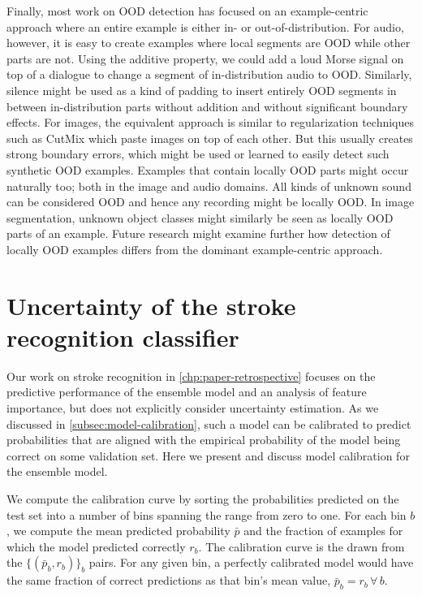 Finally, most work on OOD detection has focused on an example-centric approach where an entire example is either in- or out-of-distribution. 
For audio, however, it is easy to create examples where local segments are OOD while other parts are not. 
Using the additive property, we could add a loud Morse signal on top of a dialogue to change a segment of in-distribution audio to OOD. 
Similarly, silence might be used as a kind of padding to insert entirely OOD segments in between in-distribution parts without addition and without significant boundary effects. 
For images, the equivalent approach is similar to regularization techniques such as CutMix \parencite{yun_cutmix_2019} which paste images on top of each other. But this usually creates strong boundary errors, which might be used or learned to easily detect such synthetic OOD examples. 
Examples that contain locally OOD parts might occur naturally too; both in the image and audio domains. All kinds of unknown sound can be considered OOD and hence any recording might be locally OOD. In image segmentation, unknown object classes might similarly be seen as locally OOD parts of an example. Future research might examine further how detection of locally OOD examples differs from the dominant example-centric approach. 


\section{Uncertainty of the stroke recognition classifier} \label{sec: discussion-stroke-recognition-uncertainty}

Our work on stroke recognition in \cref{chp:paper-retrospective} focuses on the predictive performance of the ensemble model and an analysis of feature importance, but does not explicitly consider uncertainty estimation. 
As we discussed in \cref{subsec:model-calibration}, such a model can be calibrated to predict probabilities that are aligned with the empirical probability of the model being correct on some validation set. Here we present and discuss model calibration for the ensemble model. 

We compute the calibration curve by sorting the probabilities predicted on the test set into a number of bins spanning the range from zero to one. For each bin $b$, we compute the mean predicted probability $\bar{p}$ and the fraction of examples for which the model predicted correctly $r_{b}$. The calibration curve is the drawn from the $\{(\bar{p}_{b}, r_{b})\}_b$ pairs. For any given bin, a perfectly calibrated model would have the same fraction of correct predictions as that bin's mean value, $\bar{p}_{b} = r_{b}\,\forall\,b$. 

